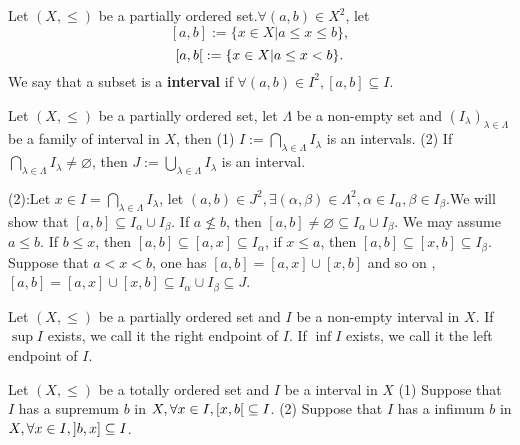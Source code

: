 \begin{definitionenv}
    Let $(X, \le)$ be a partially ordered set.$\forall (a, b)\in X^2$,  let 
    $$[a, b]:=\{x\in X|a\le x\le b \}, $$
     $$\interval[open right]{a}{b}:=\{x\in X|a\le x <b\}.$$ 
     We say that a subset is a \textbf{interval} if $\forall (a, b)\in I^2 , [a, b]\subseteq I$.
\end{definitionenv}
\begin{propositionenv}
    Let $(X, \le)$ be a partially ordered set,  let $\Lambda$ be a non-empty set and $(I_\lambda)_{\lambda\in \Lambda}$ be a family of interval in $X$,  then 
    \newline
    (1) $\displaystyle I:=\bigcap _{\lambda\in \Lambda}I_\lambda$ is an intervals.
    \newline
    (2) If $\displaystyle \bigcap _{\lambda\in \Lambda}I_\lambda\not=\varnothing $, then $\displaystyle J:=\bigcup_{\lambda\in \Lambda}I_\lambda$ is an interval.
\end{propositionenv}
\begin{proofenv}
    \quad 
    \newline
    (2):Let $x\in I=\bigcap _{\lambda\in \Lambda}I_\lambda$, let $(a, b)\in J^2, \exists (\alpha, \beta )\in \Lambda^2, \alpha\in I_\alpha, \beta\in I_\beta$.We will show that $[a, b]\subseteq I_\alpha\cup I_\beta$. If $a\not\le b $,  then $[a, b]\not =\varnothing\subseteq I_\alpha\cup I_\beta $. We may assume $a\le b $.
    \newline 
    If $b\le x$,  then $[a, b]\subseteq [a, x]\subseteq I_\alpha$,  if $x\le a $,  then $[a, b]\subseteq [x, b]\subseteq I_\beta$. Suppose that $a<x<b$,  one has $[a, b]=[a, x]\cup[x, b]$ and so on ,  $[a, b]=[a, x]\cup[x, b]\subseteq I_\alpha\cup I_\beta \subseteq J$.

\end{proofenv}
\begin{definitionenv}
    Let $(X, \le )$ be a partially ordered set and $I $ be a non-empty interval in $X$. 
    \newline
    If $\sup I$ exists,  we call it the right endpoint of $I$.
    \newline
    If $\inf I$ exists,  we call it the left endpoint of $I$.
\end{definitionenv}
\begin{propositionenv}
   Let $(X, \le )$ be a totally ordered set and $I $ be a interval in $X$ 
   \newline
   (1) Suppose that $I$ has a supremum $b$ in $X, \forall x\in I, \interval[open right]{x}{b}\subseteq I$.
   \newline
   (2) Suppose that $I$ has a infimum $b$ in $X, \forall x\in I, \interval[open left]{b}{x}\subseteq I$.
\end{propositionenv}
